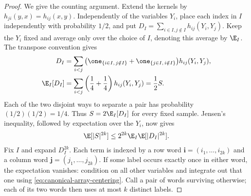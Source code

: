 \begin{proof}
We give the counting argument.  Extend the kernels by $h_{ji}(y,x)=h_{ij}(x,y)$.  Independently of the variables $Y_i$, place each index in $I$ independently with probability $1/2$, and put
$D_I=\sum_{i\in I,j\notin I}h_{ij}(Y_i,Y_j)$.
Keep the $Y_i$ fixed and average only over the choice of $I$, denoting this average by $\E_I$.  The transpose convention gives
\begin{equation}
 \begin{aligned}
 D_I&=\sum_{i<j}
 \big(\one_{\{i\in I,\,j\notin I\}}+\one_{\{j\in I,\,i\notin I\}}\big)
 h_{ij}(Y_i,Y_j),\\
 \E_I[D_I]&=\sum_{i<j}\left(\frac14+\frac14\right)h_{ij}(Y_i,Y_j)
 =\frac12 S.
 \end{aligned}
 \label{eq:array-split-identity}
\end{equation}
Each of the two disjoint ways to separate a pair has probability $(1/2)(1/2)=1/4$.  Thus $S=2\E_I[D_I]$ for every fixed sample.  Jensen's inequality, followed by expectation over the $Y_i$, now gives
\begin{equation}
 \E[|S|^{2k}]\le2^{2k}\E_I\E[|D_I|^{2k}].
 \label{eq:array-random-split}
\end{equation}
Fix $I$ and expand $D_I^{2k}$.  Each term is indexed by a row word
$\mathbf i=(i_1,\ldots,i_{2k})$ and a column word
$\mathbf j=(j_1,\ldots,j_{2k})$.
If some label occurs exactly once in either word, the expectation vanishes: condition on all other variables and integrate out that one using \eqref{eq:canonical-array-centering}.  Call a pair of words surviving otherwise; each of its two words then uses at most $k$ distinct labels.


\end{proof}
